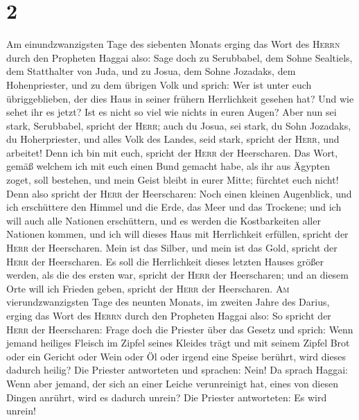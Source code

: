 \hypertarget{section-1}{%
\section{2}\label{section-1}}

 Am einundzwanzigsten Tage des siebenten Monats erging das
Wort des \textsc{Herrn} durch den Propheten Haggai also: 
Sage doch zu Serubbabel, dem Sohne Sealtiels, dem Statthalter von Juda,
und zu Josua, dem Sohne Jozadaks, dem Hohenpriester, und zu dem übrigen
Volk und sprich:  Wer ist unter euch übriggeblieben, der
dies Haus in seiner frühern Herrlichkeit gesehen hat? Und wie sehet ihr
es jetzt? Ist es nicht so viel wie nichts in euren Augen? 
Aber nun sei stark, Serubbabel, spricht der \textsc{Herr}; auch du
Josua, sei stark, du Sohn Jozadaks, du Hoherpriester, und alles Volk des
Landes, seid stark, spricht der \textsc{Herr}, und arbeitet! Denn ich
bin mit euch, spricht der \textsc{Herr} der Heerscharen. 
Das Wort, gemäß welchem ich mit euch einen Bund gemacht habe, als ihr
aus Ägypten zoget, soll bestehen, und mein Geist bleibt in eurer Mitte;
fürchtet euch nicht!  Denn also spricht der \textsc{Herr}
der Heerscharen: Noch einen kleinen Augenblick, und ich erschüttere den
Himmel und die Erde, das Meer und das Trockene;  und ich
will auch alle Nationen erschüttern, und es werden die Kostbarkeiten
aller Nationen kommen, und ich will dieses Haus mit Herrlichkeit
erfüllen, spricht der \textsc{Herr} der Heerscharen.  Mein
ist das Silber, und mein ist das Gold, spricht der \textsc{Herr} der
Heerscharen.  Es soll die Herrlichkeit dieses letzten
Hauses größer werden, als die des ersten war, spricht der \textsc{Herr}
der Heerscharen; und an diesem Orte will ich Frieden geben, spricht der
\textsc{Herr} der Heerscharen.  \textsc{Am}
vierundzwanzigsten Tage des neunten Monats, im zweiten Jahre des Darius,
erging das Wort des \textsc{Herrn} durch den Propheten Haggai also:
 So spricht der \textsc{Herr} der Heerscharen: Frage doch
die Priester über das Gesetz und sprich:  Wenn jemand
heiliges Fleisch im Zipfel seines Kleides trägt und mit seinem Zipfel
Brot oder ein Gericht oder Wein oder Öl oder irgend eine Speise berührt,
wird dieses dadurch heilig? Die Priester antworteten und sprachen: Nein!
 Da sprach Haggai: Wenn aber jemand, der sich an einer
Leiche verunreinigt hat, eines von diesen Dingen anrührt, wird es
dadurch unrein? Die Priester antworteten: Es wird unrein!
